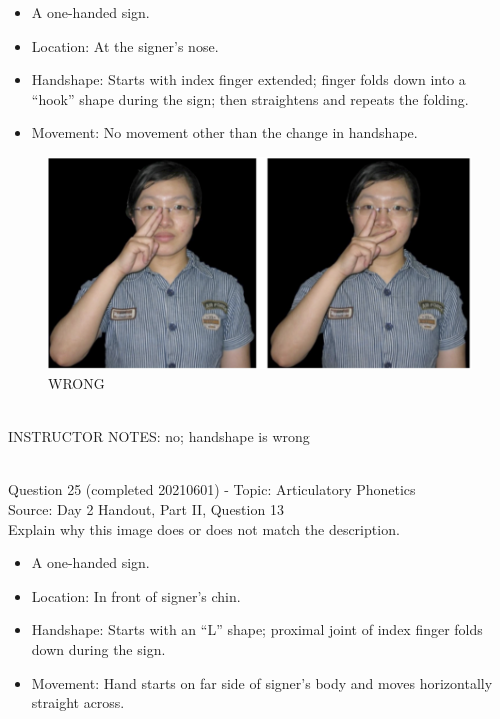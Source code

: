 \documentclass[12pt]{article}
\begin{document}
\begin{itemize} \item A one-handed sign. \item Location: At the signer’s nose. \item Handshape: Starts with index finger extended; finger folds down into a “hook” shape during the sign; then straightens and repeats the folding. \item Movement: No movement other than the change in handshape. \end{itemize}

\begin{figure}[H]
\includegraphics{../images/taiwansign_wrong.png}
\caption{WRONG}
\end{figure}

~\\
INSTRUCTOR NOTES: no; handshape is wrong


~\\

{\large Question 25} (completed 20210601) - Topic: Articulatory Phonetics\\
Source: Day 2 Handout, Part II, Question 13\\

Explain why this image does or does not match the description.\\

\begin{itemize} \item A one-handed sign. \item Location: In front of signer’s chin. \item Handshape: Starts with an “L” shape; proximal joint of index finger folds down during the sign. \item Movement: Hand starts on far side of signer’s body and moves horizontally straight across. \end{itemize}
\end{document}
